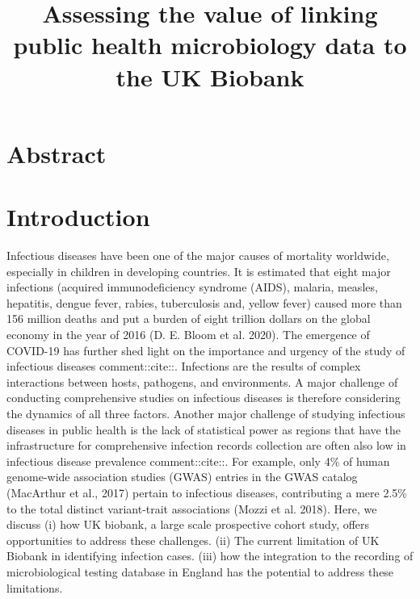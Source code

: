 \documentclass{article}
\begin{document}
\title{Assessing the value of linking public health microbiology data to the UK Biobank}

\section{Abstract}

\section{Introduction}
Infectious diseases have been one of the major causes of mortality worldwide, especially in children in developing countries. It is estimated that eight major infections (acquired immunodeficiency syndrome (AIDS), malaria, measles, hepatitis, dengue fever, rabies, tuberculosis and, yellow fever) caused more than 156 million deaths and put a burden of eight trillion dollars on the global economy in the year of 2016 (D. E. Bloom et al. 2020). The emergence of COVID-19 has further shed light on the importance and urgency of the study of infectious diseases comment::cite::. Infections are the results of complex interactions between hosts, pathogens, and environments. A major challenge of conducting comprehensive studies on infectious diseases is therefore considering the dynamics of all three factors. Another major challenge of studying infectious diseases in public health is the lack of statistical power as regions that have the infrastructure for comprehensive infection records collection are often also low in infectious disease prevalence comment::cite::. For example, only 4\% of human genome-wide association studies (GWAS) entries in the GWAS catalog (MacArthur et al., 2017) pertain to infectious diseases, contributing a mere 2.5\% to the total distinct variant-trait associations (Mozzi et al. 2018).
Here, we discuss (i) how UK biobank, a large scale prospective cohort study, offers opportunities to address these challenges. (ii) The current limitation of UK Biobank in identifying infection cases. (iii) how the integration to the recording of microbiological testing database in England has the potential to address these limitations.
\end{document}

